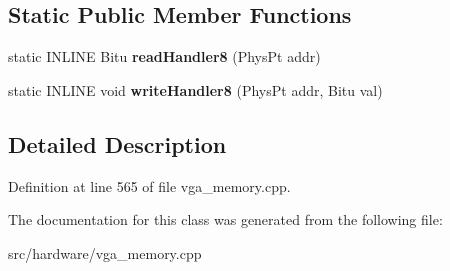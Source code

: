 \subsection*{Static Public Member Functions}
\begin{DoxyCompactItemize}
\item 
\hypertarget{classVGA__ET4000__ChainedVGA__Slow__Handler_aaaf88b1fe358e7af3b0411aa2a176fee}{static I\-N\-L\-I\-N\-E Bitu {\bfseries read\-Handler8} (Phys\-Pt addr)}\label{classVGA__ET4000__ChainedVGA__Slow__Handler_aaaf88b1fe358e7af3b0411aa2a176fee}

\item 
\hypertarget{classVGA__ET4000__ChainedVGA__Slow__Handler_ae2f914cb52258b4126058bfa4344198f}{static I\-N\-L\-I\-N\-E void {\bfseries write\-Handler8} (Phys\-Pt addr, Bitu val)}\label{classVGA__ET4000__ChainedVGA__Slow__Handler_ae2f914cb52258b4126058bfa4344198f}

\end{DoxyCompactItemize}


\subsection{Detailed Description}


Definition at line 565 of file vga\-\_\-memory.\-cpp.



The documentation for this class was generated from the following file\-:\begin{DoxyCompactItemize}
\item 
src/hardware/vga\-\_\-memory.\-cpp\end{DoxyCompactItemize}
